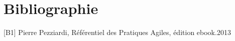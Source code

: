 
\chapter*{Bibliographie}

[B1]   Pierre Pezziardi, Référentiel des Pratiques Agiles, édition ebook.2013